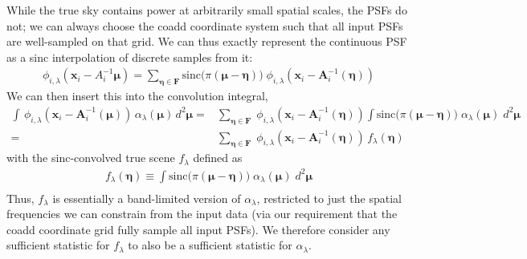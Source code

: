 \documentclass[DM,authoryear,toc]{lsstdoc}
\begin{document}
While the true sky contains power at arbitrarily small spatial scales, the PSFs do not; we can always choose the coadd coordinate system such that all
input PSFs are well-sampled on that grid.
We can thus exactly represent the continuous PSF as a sinc interpolation of
discrete samples from it:
\begin{align}
    \phi_{i,\lambda}(\bm{x}_i-A_i^{-1}\bm{\mu}) =
    \sum_{\bm{\eta} \in \bm{F}}
        \mathrm{sinc}\big(\pi(\bm{\mu}-\bm{\eta})\big)
        \;\phi_{i,\lambda}\!\left(
            \bm{x}_i - \bm{A}_i^{-1}(\bm{\eta})
        \right)
\end{align}
We can then insert this into the convolution integral,
\begin{align}
    \int\!
        \, \phi_{i,\lambda}\!\left(\bm{x}_i-\bm{A}_i^{-1}(\bm{\mu})\right)
        \, \alpha_{\lambda}(\bm{\mu})
        \, d^2\bm{\mu}
    = &
    \sum_{\bm{\eta} \in \bm{F}}
        \;\phi_{i,\lambda}\!\left(
            \bm{x}_i - \bm{A}_i^{-1}(\bm{\eta})
        \right)
        \!\int\!
        \mathrm{sinc}\big(\pi(\bm{\mu}-\bm{\eta})\big)
        \; \alpha_{\lambda}(\bm{\mu})
        \; d^2\bm{\mu} \\
    = &
    \sum_{\bm{\eta} \in \bm{F}}
        \;\phi_{i,\lambda}\!\left(
            \bm{x}_i - \bm{A}_i^{-1}(\bm{\eta})
        \right)
        \, f_{\lambda}(\bm{\eta})
\end{align}
with the sinc-convolved true scene $f_{\lambda}$ defined as
\begin{align}
    f_{\lambda}(\bm{\eta}) \equiv \int\!
        \mathrm{sinc}\big(\pi(\bm{\mu}-\bm{\eta})\big)
        \; \alpha_{\lambda}(\bm{\mu})
        \; d^2\bm{\mu} \\
\end{align}
Thus, $f_{\lambda}$ is essentially a band-limited version of $\alpha_{\lambda}$, restricted to just the spatial frequencies we can constrain from the input data (via our requirement that the coadd coordinate grid fully sample all input PSFs).
We therefore consider any sufficient statistic for $f_{\lambda}$ to also be a sufficient statistic for $\alpha_{\lambda}$.
\end{document}
